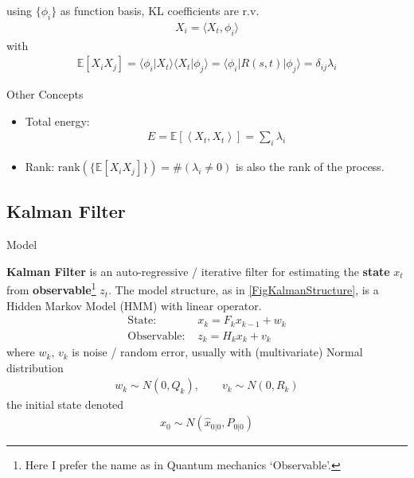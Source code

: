 using $ \{\phi _i\} $ as function basis, KL coefficients are r.v. 
\begin{align}
    X_i=\langle X_t, \phi _i\rangle  
\end{align}
with
\begin{align}
    \mathbb{E}\left[ X_iX_j \right] = \langle \phi_i | X_t\rangle \langle X_t| \phi_j\rangle =  \langle \phi_i | R(s,t) | \phi_j\rangle = \delta _{ij}\lambda _i
\end{align}

\begin{point}
Other Concepts
\end{point}
\begin{itemize}[topsep=2pt,itemsep=0pt]
    \item Total energy:
    \begin{align}
        E=\mathbb{E}\left[ \left\langle X_t,X_t \right\rangle \right]=\sum_i\lambda _i
    \end{align}
    \item Rank: $ \mathrm{rank}\left(\{\mathbb{E}\left[ X_iX_j \right] \}\right) = \#(\lambda _i\neq 0) $ is also the rank of the process.
    
\end{itemize}

    














\subsection{Kalman Filter}
\begin{point}
    Model
\end{point}

    \textbf{Kalman Filter} is an auto-regressive / iterative filter for estimating the \textbf{state} $ x_t $ from \textbf{observable}\footnote{Here I prefer the name as in Quantum mechanics `Observable'.} $ z_t $. The model structure, as in \autoref{FigKalmanStructure}, is a Hidden Markov Model (HMM) with linear operator.
    \begin{align}
        \text{State: }&x_{k}=F_{k}x_{k-1}+w_{k} \\
        \text{Observable: }&z_{k}=H_kx_k+v_k
    \end{align}  
    where $ w_k,\,v_k $ is noise / random error, usually with (multivariate) Normal distribution
    \begin{align}
        w_k\sim N(0,Q_k),\qquad v_k\sim N(0,R_k) 
    \end{align}
    the initial state denoted
    \begin{align}
        x_0\sim N(\hat{x}_{0|0}, P _{0|0}) 
    \end{align}

